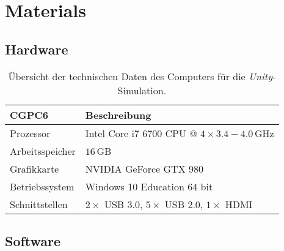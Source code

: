 \section{Materials}\label{sec:Materials}

\subsection{Hardware}\label{sec:Hardware}



\begin{table}
	\centering
	\begin{tabular}{|l|l|}
		\hline
		\Absatzbox{}
		\textbf{CGPC6}& \textbf{Beschreibung} \\
		\hline
		Prozessor & Intel Core i7 6700 CPU @ $4\times3.4-4.0\,$GHz \\
		\hline
		Arbeitsspeicher & $16\,$GB \\
 		\hline 
		Grafikkarte & NVIDIA GeForce GTX 980\\
		\hline
		Betriebssystem & Windows 10 Education 64 bit \\
		\hline
		Schnittstellen & $2\times$ USB 3.0, $5\times$ USB 2.0, $1\times $ HDMI\\
		\hline
	\end{tabular}
	\caption[Übersicht technische Daten des Computers für \emph{Unity}-Simulation]{Übersicht der technischen Daten des Computers für die \emph{Unity}-Simulation.}
	\label{tab:Computer}
\end{table}




\subsection{Software}



\newpage
